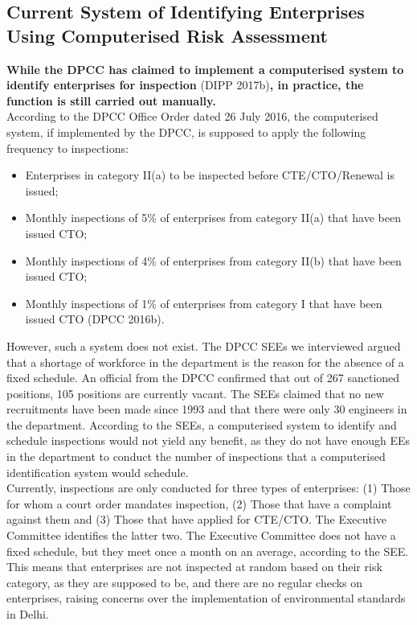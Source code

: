 \documentclass[a4paper, 12pt]{article}
\begin{document}
	\subsection{Current System of Identifying Enterprises Using Computerised Risk Assessment}
	
	\textbf{While the DPCC has claimed to implement a computerised system to identify enterprises for inspection} (DIPP 2017b)\textbf{, in practice, the function is still carried out manually.} \\
	
	According to the DPCC Office Order dated 26 July 2016, the computerised system, if implemented by the DPCC, is supposed to apply the following frequency to inspections: \\
	
	\begin{itemize}
	\item{Enterprises in category II(a) to be inspected before CTE/CTO/Renewal is issued;}
	\item{Monthly inspections of 5\% of enterprises from category II(a) that have been issued CTO;}
	\item{Monthly inspections of 4\% of enterprises from category II(b) that have been issued CTO;}
	\item{Monthly inspections of 1\% of enterprises from category I that have been issued CTO (DPCC 2016b).}
	\end{itemize} 
	
	However, such a system does not exist. The DPCC SEEs we interviewed argued that a shortage of workforce in the department is the reason for the absence of a fixed schedule. An official from the DPCC confirmed that out of 267 sanctioned positions, 105 positions are currently vacant. The SEEs claimed that no new recruitments have been made since 1993 and that there were only 30 engineers in the department. According to the SEEs, a computerised system to identify and schedule inspections would not yield any benefit, as they do not have enough EEs in the department to conduct the number of inspections that a computerised identification system would schedule. \\
	
	Currently, inspections are only conducted for three types of enterprises: (1) Those for whom a court order mandates inspection, (2) Those that have a complaint against them and (3) Those that have applied for CTE/CTO. The Executive Committee identifies the latter two. The Executive Committee does not have a fixed schedule, but they meet once a month on an average, according to the SEE. This means that enterprises are not inspected at random based on their risk category, as they are supposed to be, and there are no regular checks on enterprises, raising concerns over the implementation of environmental standards in Delhi. \\
	
\end{document}
